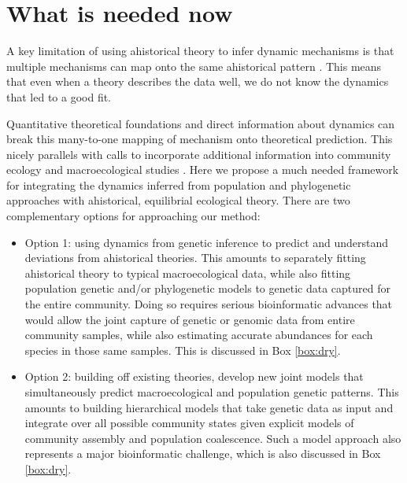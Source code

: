 \documentclass[12pt]{article}
\newcounter{Box}
\begin{document}
\section{What is needed now}

A key limitation of using ahistorical theory to infer dynamic
mechanisms is that multiple mechanisms can map onto the same ahistorical pattern \citep{Kendall1948-pj, Kendall1948-ri,
  Engen1996-jt, Engen1996-na, McGill2003-sf}.  This means that even
when a theory describes the data well, we do not know the
dynamics that led to a good fit. 
% 
% 

Quantitative theoretical foundations and direct information about
dynamics can break this many-to-one mapping of mechanism onto
theoretical prediction. This nicely parallels with calls to incorporate
additional information into community ecology and macroecological
studies \citep{McGill2007-zd}. Here we propose a much needed framework for
% 
% 
% 
% 
integrating the dynamics inferred from population and phylogenetic
approaches with ahistorical, equilibrial ecological theory. There are
two complementary options for approaching our method:

\begin{itemize}
\item Option 1: using dynamics from genetic inference to predict and
  understand deviations from ahistorical theories. This amounts to
  separately fitting ahistorical theory to typical macroecological
  data, while also fitting population genetic
  and/or phylogenetic models to genetic data captured
  for the entire community. Doing so requires serious bioinformatic
  advances that would allow the joint capture of genetic or genomic
  data from entire community samples, while also estimating accurate
  abundances for each species in those same samples. This is discussed
  in Box \ref{box:dry}.
\item Option 2: building off existing theories, develop new joint
  models that simultaneously predict macroecological and population
  genetic patterns. This amounts to building hierarchical models that
  take genetic data as input and integrate over all possible community
  states given explicit models of community assembly and population
  coalescence. Such a model approach also represents a major
  bioinformatic challenge, which is also discussed in Box
  \ref{box:dry}.
\end{itemize}
\end{document}
